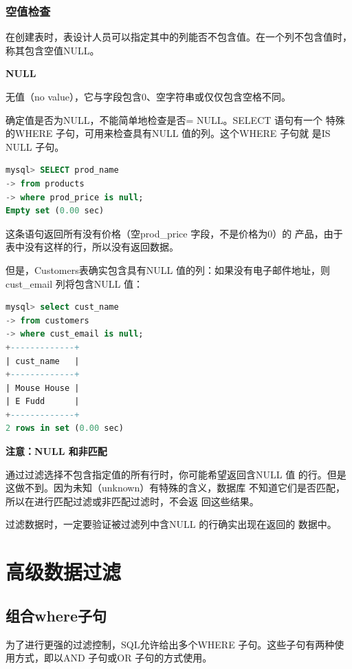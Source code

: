 \documentclass[11pt,a4paper,oneside]{book}
\begin{document}
\subsection{空值检查}
在创建表时，表设计人员可以指定其中的列能否不包含值。在一个列不包含值时，称其包含空值NULL。
\begin{tcolorbox}[colback=blue!7!white,colframe=blue!40]
	\textbf{NULL}
	
	无值（no value），它与字段包含0、空字符串或仅仅包含空格不同。
\end{tcolorbox}

确定值是否为NULL，不能简单地检查是否= NULL。SELECT 语句有一个
特殊的WHERE 子句，可用来检查具有NULL 值的列。这个WHERE 子句就
是IS NULL 子句。
\begin{lstlisting}[language=sql]
mysql> SELECT prod_name
-> from products
-> where prod_price is null;
Empty set (0.00 sec)
\end{lstlisting}
这条语句返回所有没有价格（空prod\_price 字段，不是价格为0）的
产品，由于表中没有这样的行，所以没有返回数据。

但是，Customers表确实包含具有NULL 值的列：如果没有电子邮件地址，则cust\_email
列将包含NULL 值：
\begin{lstlisting}[language=sql]
mysql> select cust_name
-> from customers
-> where cust_email is null;
+-------------+
| cust_name   |
+-------------+
| Mouse House |
| E Fudd      |
+-------------+
2 rows in set (0.00 sec)
\end{lstlisting}
\begin{tcolorbox}[colback=pink!10!white,colframe=pink!100!black]
\textbf{注意：NULL 和非匹配}

通过过滤选择不包含指定值的所有行时，你可能希望返回含NULL 值
的行。但是这做不到。因为未知（unknown）有特殊的含义，数据库
不知道它们是否匹配，所以在进行匹配过滤或非匹配过滤时，不会返
回这些结果。

过滤数据时，一定要验证被过滤列中含NULL 的行确实出现在返回的
数据中。
\end{tcolorbox}

\chapter{高级数据过滤}
\section{组合where子句}
为了进行更强的过滤控制，SQL允许给出多个WHERE 子句。这些子句有两种使用方式，即以AND 子句或OR 子句的方式使用。
\end{document}
